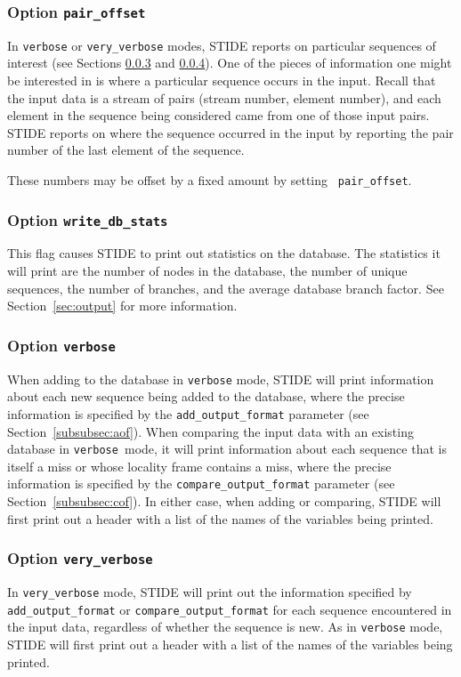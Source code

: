 \documentclass{amsart}
\begin{document}
\subsubsection{Option {\tt pair\_offset}} \label{subsubsec:po}
In {\tt verbose} or {\tt very\_verbose} modes, STIDE reports on
particular sequences of interest (see Sections \ref{subsubsec:verbose}
and \ref{subsubsec:very-verbose}).  One of the pieces of information
one might be interested in is where a particular sequence occurs in
the input.  Recall that the input data is a stream of pairs (stream
number, element number), and each element in the sequence being
considered came from one of those input pairs.  STIDE reports on where
the sequence occurred in the input by reporting the pair number of the
last element of the sequence.

These numbers may be offset by a fixed amount by setting {\tt
pair\_offset}. 

\subsubsection{Option {\tt write\_db\_stats}}
This flag causes STIDE to print out statistics on the database.  The
statistics it will print are the number of nodes in the database, the
number of unique sequences, the number of branches, and the average
database branch factor.  See Section~\ref{sec:output} for more
information.

\subsubsection{Option {\tt verbose}} \label{subsubsec:verbose}
When adding to the database in {\tt verbose} mode, STIDE will print
information about each new sequence being added to the database, where
the precise information is specified by the {\tt add\_output\_format}
parameter (see Section~\ref{subsubsec:aof}).  When comparing the input
data with an existing database in {\tt verbose }mode, it will print
information about each sequence that is itself a miss or whose
locality frame contains a miss, where the precise information is
specified by the {\tt compare\_output\_format} parameter (see
Section~\ref{subsubsec:cof}).  In either case, when adding or
comparing, STIDE will first print out a header with a list of the names
of the variables being printed.

\subsubsection{Option {\tt very\_verbose}} \label{subsubsec:very-verbose}
In {\tt very\_verbose} mode, STIDE will print out the information specified
by {\tt add\_output\_format} or {\tt compare\_output\_format} for each sequence
encountered in the input data, regardless of whether the sequence is
new.  As in {\tt verbose} mode, STIDE will first print out a header
with a list of the names of the variables being printed.
\end{document}

